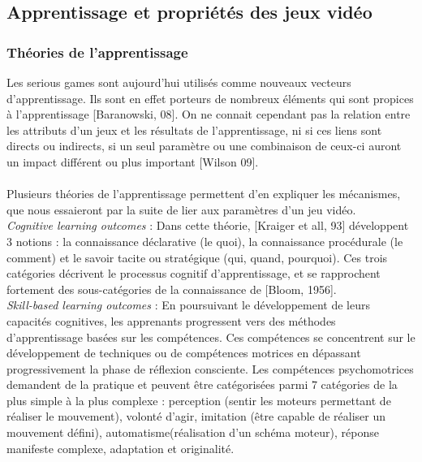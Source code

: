 	\subsection{Apprentissage et propriétés des jeux vidéo}
			\subsubsection*{Théories de l'apprentissage}
Les serious games sont aujourd'hui utilisés comme nouveaux vecteurs d'apprentissage. Ils sont en effet porteurs de nombreux éléments qui sont propices à l'apprentissage [Baranowski, 08]. On ne connait cependant pas la relation entre les attributs d'un jeux et les résultats de l'apprentissage, ni si ces liens sont directs ou indirects, si un seul paramètre ou une combinaison de ceux-ci auront un impact différent ou plus important [Wilson 09]\cite{Wils09}. 

\paragraph{}Plusieurs théories de l'apprentissage permettent d'en expliquer les mécanismes, que nous essaieront par la suite de lier aux paramètres d'un jeu vidéo.\\

\emph{Cognitive learning outcomes} :  Dans cette théorie, [Kraiger et all, 93] développent 3 notions : la connaissance déclarative (le quoi), la connaissance procédurale (le comment) et le savoir tacite ou stratégique (qui, quand, pourquoi). Ces trois catégories décrivent le processus cognitif d'apprentissage, et se rapprochent fortement des sous-catégories de la connaissance de [Bloom, 1956].\\ 

\emph{Skill-based learning outcomes} : En poursuivant le développement de leurs capacités cognitives, les apprenants progressent vers des méthodes d'apprentissage basées sur les compétences. Ces compétences se concentrent sur le développement de techniques ou de compétences motrices en dépassant progressivement la phase de réflexion consciente. Les compétences psychomotrices demandent de la pratique et peuvent être catégorisées parmi 7 catégories de la plus simple à la plus complexe : perception (sentir les moteurs permettant de réaliser le mouvement), volonté d'agir, imitation (être capable de réaliser un mouvement défini), automatisme(réalisation d'un schéma moteur), réponse manifeste complexe, adaptation et originalité.\\ 


